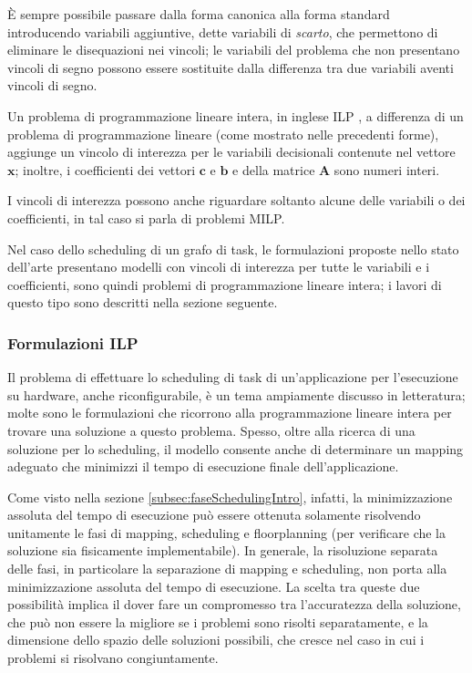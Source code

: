 È sempre possibile passare dalla forma canonica alla forma standard 
introducendo variabili aggiuntive, dette variabili di \emph{scarto}, che 
permettono di eliminare le disequazioni nei vincoli; le variabili del problema 
che non presentano vincoli di segno possono essere sostituite dalla differenza 
tra due variabili aventi vincoli di segno.

Un problema di programmazione lineare intera, in inglese \ac{ILP}
\cite{ILPBook}, a differenza di un problema di programmazione lineare (come mostrato
nelle precedenti forme), aggiunge un vincolo di interezza per le variabili decisionali
contenute nel vettore $\mathbf{x}$; inoltre, i coefficienti dei vettori $\mathbf{c}$
e $\mathbf{b}$ e della matrice $\mathbf{A}$ sono numeri interi.

I vincoli di interezza possono anche riguardare soltanto alcune delle variabili o 
dei coefficienti, in tal caso si parla di problemi \ac{MILP}.

Nel caso dello scheduling di un grafo di task, le formulazioni proposte nello 
stato dell'arte presentano modelli con vincoli di interezza per tutte le 
variabili e i coefficienti, sono quindi problemi di programmazione lineare 
intera; i lavori di questo tipo sono descritti nella sezione seguente.


\subsubsection{Formulazioni \acs{ILP}}
Il problema di effettuare lo scheduling di task di un'applicazione per 
l'esecuzione su hardware, anche riconfigurabile, è un tema ampiamente discusso 
in letteratura; molte sono le formulazioni che ricorrono alla programmazione 
lineare intera per trovare una soluzione a questo problema. Spesso, oltre alla 
ricerca di una soluzione per lo scheduling, il modello consente anche di 
determinare un mapping adeguato che minimizzi il tempo di esecuzione finale
dell'applicazione.

Come visto nella sezione \ref{subsec:faseSchedulingIntro}, infatti, la minimizzazione assoluta 
del tempo di esecuzione può essere ottenuta solamente risolvendo unitamente le 
fasi di mapping, scheduling e floorplanning (per verificare che la soluzione 
sia fisicamente implementabile). In generale, la risoluzione separata delle fasi, in 
particolare la separazione di mapping e scheduling, non porta alla 
minimizzazione assoluta del tempo di esecuzione. La scelta tra queste due 
possibilità implica il dover fare un compromesso tra l'accuratezza della 
soluzione, che può non essere la migliore se i problemi sono risolti 
separatamente, e la dimensione dello spazio delle soluzioni possibili, che 
cresce nel caso in cui i problemi si risolvano congiuntamente.

